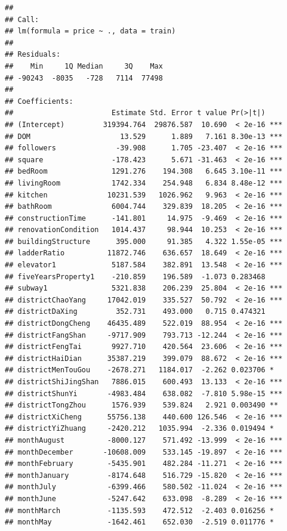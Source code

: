 \documentclass[
]{article}
\begin{document}
\begin{verbatim}
## 
## Call:
## lm(formula = price ~ ., data = train)
## 
## Residuals:
##    Min     1Q Median     3Q    Max 
## -90243  -8035   -728   7114  77498 
## 
## Coefficients:
##                       Estimate Std. Error t value Pr(>|t|)    
## (Intercept)         319394.764  29876.587  10.690  < 2e-16 ***
## DOM                     13.529      1.889   7.161 8.30e-13 ***
## followers              -39.908      1.705 -23.407  < 2e-16 ***
## square                -178.423      5.671 -31.463  < 2e-16 ***
## bedRoom               1291.276    194.308   6.645 3.10e-11 ***
## livingRoom            1742.334    254.948   6.834 8.48e-12 ***
## kitchen              10231.539   1026.962   9.963  < 2e-16 ***
## bathRoom              6004.744    329.839  18.205  < 2e-16 ***
## constructionTime      -141.801     14.975  -9.469  < 2e-16 ***
## renovationCondition   1014.437     98.944  10.253  < 2e-16 ***
## buildingStructure      395.000     91.385   4.322 1.55e-05 ***
## ladderRatio          11872.746    636.657  18.649  < 2e-16 ***
## elevator1             5187.584    382.891  13.548  < 2e-16 ***
## fiveYearsProperty1    -210.859    196.589  -1.073 0.283468    
## subway1               5321.838    206.239  25.804  < 2e-16 ***
## districtChaoYang     17042.019    335.527  50.792  < 2e-16 ***
## districtDaXing         352.731    493.000   0.715 0.474321    
## districtDongCheng    46435.489    522.019  88.954  < 2e-16 ***
## districtFangShan     -9717.909    793.713 -12.244  < 2e-16 ***
## districtFengTai       9927.710    420.564  23.606  < 2e-16 ***
## districtHaiDian      35387.219    399.079  88.672  < 2e-16 ***
## districtMenTouGou    -2678.271   1184.017  -2.262 0.023706 *  
## districtShiJingShan   7886.015    600.493  13.133  < 2e-16 ***
## districtShunYi       -4983.484    638.082  -7.810 5.98e-15 ***
## districtTongZhou      1576.939    539.824   2.921 0.003490 ** 
## districtXiCheng      55756.138    440.600 126.546  < 2e-16 ***
## districtYiZhuang     -2420.212   1035.994  -2.336 0.019494 *  
## monthAugust          -8000.127    571.492 -13.999  < 2e-16 ***
## monthDecember       -10608.009    533.145 -19.897  < 2e-16 ***
## monthFebruary        -5435.901    482.284 -11.271  < 2e-16 ***
## monthJanuary         -8174.648    516.729 -15.820  < 2e-16 ***
## monthJuly            -6399.466    580.502 -11.024  < 2e-16 ***
## monthJune            -5247.642    633.098  -8.289  < 2e-16 ***
## monthMarch           -1135.593    472.512  -2.403 0.016256 *  
## monthMay             -1642.461    652.030  -2.519 0.011776 *  

\end{verbatim}
\end{document}
